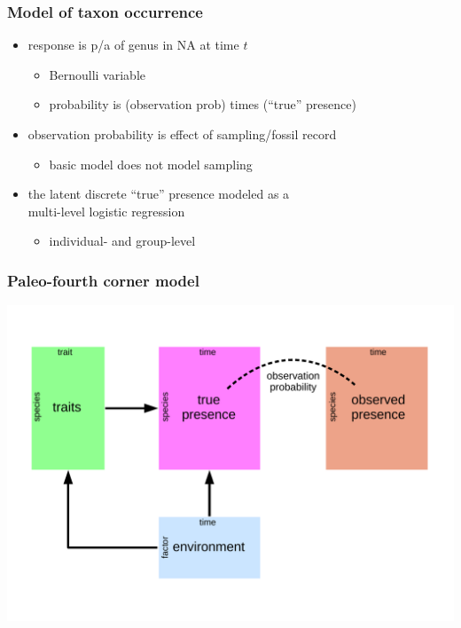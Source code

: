\documentclass{beamer}
\begin{document}
\begin{frame}
  \frametitle{Model of taxon occurrence}
  \begin{itemize}
    \item response is p/a of genus in NA at time \(t\)
      \begin{itemize}
        \item Bernoulli variable 
        \item probability is (observation prob) times (``true'' presence)
      \end{itemize}
    \item observation probability is effect of sampling/fossil record
      \begin{itemize}
        \item basic model does not model sampling
      \end{itemize}
    \item the latent discrete ``true'' presence modeled as a \\multi-level logistic regression
      \begin{itemize}
        \item individual- and group-level
      \end{itemize}
  \end{itemize}
\end{frame}

\begin{frame}
  \frametitle{Paleo-fourth corner model}
  \begin{center}
    \includegraphics[height=0.8\textheight,width=\textwidth,keepaspectratio=true]{figure/paleo_fourth_corner}
  \end{center}
\end{frame}
\end{document}
